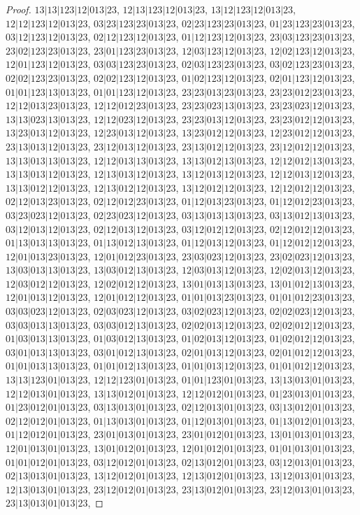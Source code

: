 \documentclass[12pt]{article}
\theoremstyle{plain}
\theoremstyle{definition}
\theoremstyle{remark}
\begin{document}
\begin{proof}
$13|13|123|12|013|23$, $12|13|123|12|013|23$, $13|12|123|12|013|23$, $12|12|123|12|013|23$, $03|23|123|23|013|23$, $02|23|123|23|013|23$, $01|23|123|23|013|23$, $03|12|123|12|013|23$, $02|12|123|12|013|23$, $01|12|123|12|013|23$, $23|03|123|23|013|23$, $23|02|123|23|013|23$, $23|01|123|23|013|23$, $12|03|123|12|013|23$, $12|02|123|12|013|23$, $12|01|123|12|013|23$, $03|03|123|23|013|23$, $02|03|123|23|013|23$, $03|02|123|23|013|23$, $02|02|123|23|013|23$, $02|02|123|12|013|23$, $01|02|123|12|013|23$, $02|01|123|12|013|23$, $01|01|123|13|013|23$, $01|01|123|12|013|23$, $23|23|013|23|013|23$, $23|23|012|23|013|23$, $12|12|013|23|013|23$, $12|12|012|23|013|23$, $23|23|023|13|013|23$, $23|23|023|12|013|23$, $13|13|023|13|013|23$, $12|12|023|12|013|23$, $23|23|013|12|013|23$, $23|23|012|12|013|23$, $13|23|013|12|013|23$, $12|23|013|12|013|23$, $13|23|012|12|013|23$, $12|23|012|12|013|23$, $23|13|013|12|013|23$, $23|12|013|12|013|23$, $23|13|012|12|013|23$, $23|12|012|12|013|23$, $13|13|013|13|013|23$, $12|12|013|13|013|23$, $13|13|012|13|013|23$, $12|12|012|13|013|23$, $13|13|013|12|013|23$, $12|13|013|12|013|23$, $13|12|013|12|013|23$, $12|12|013|12|013|23$, $13|13|012|12|013|23$, $12|13|012|12|013|23$, $13|12|012|12|013|23$, $12|12|012|12|013|23$, $02|12|013|23|013|23$, $02|12|012|23|013|23$, $01|12|013|23|013|23$, $01|12|012|23|013|23$, $03|23|023|12|013|23$, $02|23|023|12|013|23$, $03|13|013|13|013|23$, $03|13|012|13|013|23$, $03|12|013|12|013|23$, $02|12|013|12|013|23$, $03|12|012|12|013|23$, $02|12|012|12|013|23$, $01|13|013|13|013|23$, $01|13|012|13|013|23$, $01|12|013|12|013|23$, $01|12|012|12|013|23$, $12|01|013|23|013|23$, $12|01|012|23|013|23$, $23|03|023|12|013|23$, $23|02|023|12|013|23$, $13|03|013|13|013|23$, $13|03|012|13|013|23$, $12|03|013|12|013|23$, $12|02|013|12|013|23$, $12|03|012|12|013|23$, $12|02|012|12|013|23$, $13|01|013|13|013|23$, $13|01|012|13|013|23$, $12|01|013|12|013|23$, $12|01|012|12|013|23$, $01|01|013|23|013|23$, $01|01|012|23|013|23$, $03|03|023|12|013|23$, $02|03|023|12|013|23$, $03|02|023|12|013|23$, $02|02|023|12|013|23$, $03|03|013|13|013|23$, $03|03|012|13|013|23$, $02|02|013|12|013|23$, $02|02|012|12|013|23$, $01|03|013|13|013|23$, $01|03|012|13|013|23$, $01|02|013|12|013|23$, $01|02|012|12|013|23$, $03|01|013|13|013|23$, $03|01|012|13|013|23$, $02|01|013|12|013|23$, $02|01|012|12|013|23$, $01|01|013|13|013|23$, $01|01|012|13|013|23$, $01|01|013|12|013|23$, $01|01|012|12|013|23$, $13|13|123|01|013|23$, $12|12|123|01|013|23$, $01|01|123|01|013|23$, $13|13|013|01|013|23$, $12|12|013|01|013|23$, $13|13|012|01|013|23$, $12|12|012|01|013|23$, $01|23|013|01|013|23$, $01|23|012|01|013|23$, $03|13|013|01|013|23$, $02|12|013|01|013|23$, $03|13|012|01|013|23$, $02|12|012|01|013|23$, $01|13|013|01|013|23$, $01|12|013|01|013|23$, $01|13|012|01|013|23$, $01|12|012|01|013|23$, $23|01|013|01|013|23$, $23|01|012|01|013|23$, $13|01|013|01|013|23$, $12|01|013|01|013|23$, $13|01|012|01|013|23$, $12|01|012|01|013|23$, $01|01|013|01|013|23$, $01|01|012|01|013|23$, $03|12|012|01|013|23$, $02|13|012|01|013|23$, $03|12|013|01|013|23$, $02|13|013|01|013|23$, $13|12|012|01|013|23$, $12|13|012|01|013|23$, $13|12|013|01|013|23$, $12|13|013|01|013|23$, $23|12|012|01|013|23$, $23|13|012|01|013|23$, $23|12|013|01|013|23$, $23|13|013|01|013|23$, 
\end{proof}
\end{document}
